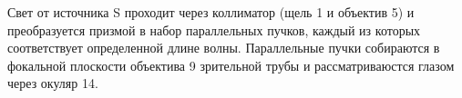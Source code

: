 Свет от источника S проходит через коллиматор (щель 1 и объектив 5) и преобразуется призмой в набор параллельных пучков, каждый из которых соответствует определенной длине волны. Параллельные пучки собираются в фокальной плоскости объектива 9 зрительной трубы и рассматриваюстся глазом через окуляр 14.

